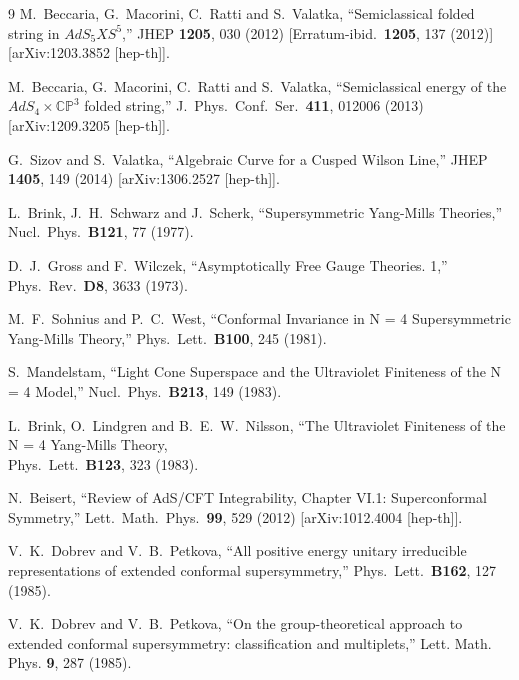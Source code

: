 \documentclass[a4paper,11pt]{article}
\numberwithin{equation}{section}
\begin{document}
\begin{thebibliography} {9}
  M.~Beccaria, G.~Macorini, C.~Ratti and S.~Valatka,
  ``Semiclassical folded string in $AdS_5 X S^5$,''
  JHEP {\bf 1205}, 030 (2012)
  [Erratum-ibid.\  {\bf 1205}, 137 (2012)]
  [arXiv:1203.3852 [hep-th]].

  M.~Beccaria, G.~Macorini, C.~Ratti and S.~Valatka,
  ``Semiclassical energy of the $AdS_4 \times \mathbb{CP}^3$ folded string,''
  J.\ Phys.\ Conf.\ Ser.\  {\bf 411}, 012006 (2013)
  [arXiv:1209.3205 [hep-th]].

  G.~Sizov and S.~Valatka,
  ``Algebraic Curve for a Cusped Wilson Line,''
  JHEP {\bf 1405}, 149 (2014)
  [arXiv:1306.2527 [hep-th]].

 L.~Brink, J.~H.~Schwarz and J.~Scherk, 
 ``Supersymmetric Yang-Mills Theories,''
  Nucl.\ Phys.\ {\bf B121}, 77 (1977).

	D.~J.~Gross and F.~Wilczek, 
	``Asymptotically Free Gauge Theories. 1,''
	Phys.\ Rev.\ {\bf D8}, 3633 (1973).

	M.~F.~Sohnius and P.~C.~West, 
	``Conformal Invariance in N = 4 Supersymmetric Yang-Mills Theory,'' 
	Phys.\ Lett.\ {\bf B100}, 245 (1981). 

	S.~Mandelstam,
	``Light Cone Superspace and the Ultraviolet Finiteness of the N = 4 Model,''
	Nucl.\ Phys.\ {\bf B213}, 149 (1983).

	L.~Brink, O.~Lindgren and B.~E.~W.~Nilsson,
	``The Ultraviolet Finiteness of the N = 4 Yang-Mills Theory,\\
	Phys.\ Lett.\ {\bf B123}, 323 (1983).

  N.~Beisert,
  ``Review of AdS/CFT Integrability, Chapter VI.1: Superconformal Symmetry,''
  Lett.\ Math.\ Phys.\  {\bf 99}, 529 (2012)
  [arXiv:1012.4004 [hep-th]].

	V.~K.~Dobrev and V.~B.~Petkova, 
	``All positive energy unitary irreducible representations of extended conformal supersymmetry,''
	Phys.\ Lett.\ {\bf B162}, 127 (1985).

	V.~K.~Dobrev and V.~B.~Petkova,
	``On the group-theoretical approach to extended conformal supersymmetry: classification and multiplets,''
	Lett. Math. Phys. {\bf 9}, 287 (1985).


\end{thebibliography}
\end{document}

